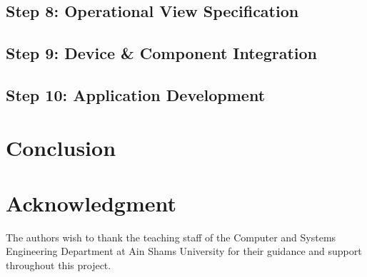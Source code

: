 \documentclass[conference]{IEEEtran}
\begin{document}
\cite{idkfactchecking2025}

\subsection{Step 8: Operational View Specification}

\subsection{Step 9: Device \& Component Integration}

\subsection{Step 10: Application Development}


\section{Conclusion}


\section*{Acknowledgment}
The authors wish to thank the teaching staff of the Computer and Systems Engineering Department at Ain Shams University for their guidance and support throughout this project.




\end{document}
